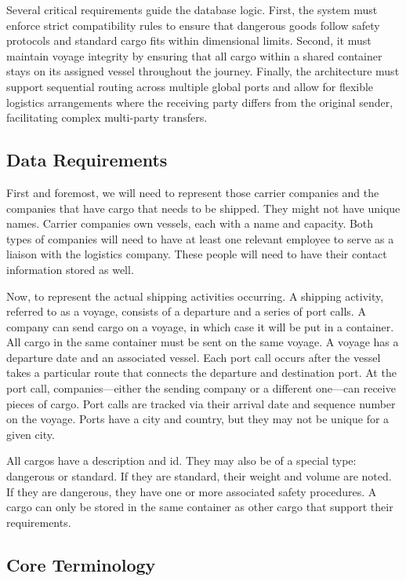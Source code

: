 \documentclass[11pt]{article}
\begin{document}
Several critical requirements guide the database logic. First, the system must enforce strict compatibility rules to ensure that dangerous goods follow safety protocols and standard cargo fits within dimensional limits. Second, it must maintain voyage integrity by ensuring that all cargo within a shared container stays on its assigned vessel throughout the journey. Finally, the architecture must support sequential routing across multiple global ports and allow for flexible logistics arrangements where the receiving party differs from the original sender, facilitating complex multi-party transfers.

\subsection{Data Requirements}

First and foremost, we will need to represent those carrier companies and the companies that have cargo that needs to be shipped. They might not have unique names. Carrier companies own vessels, each with a name and capacity. Both types of companies will need to have at least one relevant employee to serve as a liaison with the logistics company. These people will need to have their contact information stored as well.

Now, to represent the actual shipping activities occurring. A shipping activity, referred to as a voyage, consists of a departure and a series of port calls. A company can send cargo on a voyage, in which case it will be put in a container. All cargo in the same container must be sent on the same voyage. A voyage has a departure date and an associated vessel. Each port call occurs after the vessel takes a particular route that connects the departure and destination port. At the port call, companies—either the sending company or a different one—can receive pieces of cargo. Port calls are tracked via their arrival date and sequence number on the voyage. Ports have a city and country, but they may not be unique for a given city.

All cargos have a description and id. They may also be of a special type: dangerous or standard. If they are standard, their weight and volume are noted. If they are dangerous, they have one or more associated safety procedures. A cargo can only be stored in the same container as other cargo that support their requirements.

\subsection{Core Terminology}
\end{document}
